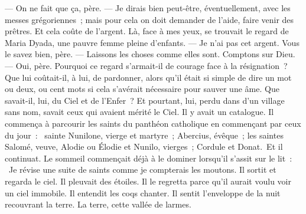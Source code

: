 \pend
%
\pstart
  \guillemotright --- On ne fait que ça, père.
\pend
%
\pstart
  \guillemotright --- Je dirais bien peut-être, éventuellement, avec les messes grégoriennes ; mais pour cela on doit demander de l’aide, faire venir des prêtres. Et cela coûte de l'argent.
\pend
%
\pstart
  \guillemotright Là, face à mes yeux, se trouvait le regard de Maria Dyada, une pauvre femme pleine d’enfants.
\pend
%
\pstart
  \guillemotright --- Je n’ai pas cet argent. Vous le savez bien, père.
\pend
%
\pstart
  \guillemotright --- Laissons les choses comme elles sont. Comptons sur Dieu.
\pend
%
\pstart
  \guillemotright --- Oui, père.\fg{}
\pend
%
\pstart
  Pourquoi ce regard s’armait-il de courage face à la résignation ? Que lui coûtait-il, à lui, de pardonner, alors qu’il était si simple de dire un mot ou deux, ou cent mots si cela s’avérait nécessaire pour sauver une âme. Que savait-il, lui, du Ciel et de l’Enfer ? Et pourtant, lui, perdu dans d’un village sans nom, savait ceux qui avaient mérité le Ciel. Il y avait un catalogue. Il commença à parcourir les saints du panthéon catholique en commençant par ceux du jour : \og{} sainte Nunilone, vierge et martyre ; Abercius, évêque ; les saintes Salomé, veuve, Alodie ou Élodie et Nunilo, vierges ; Cordule et Donat. \fg{}Et il continuat. Le sommeil commençait déjà à le dominer lorsqu’il s’assit sur le lit : \og{} Je révise une suite de saints comme je compterais les moutons.\fg{}
\pend
%
\pstart
  Il sortit et regarda le ciel. Il pleuvait des étoiles. Il le regretta parce qu’il aurait voulu voir un ciel immobile. Il entendit les coqs chanter. Il sentit l’enveloppe de la nuit recouvrant la terre. La terre, \og{}cette vallée de larmes\fg{}.
\pend
